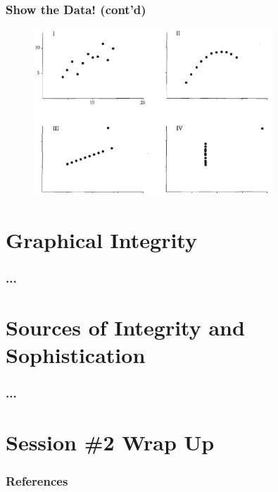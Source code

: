 \documentclass[notes, aspectratio=1610]{beamer}
\begin{document}
\begin{frame}
	\frametitle{Show the Data! (cont'd)}
	\begin{figure}
		\begin{small}
			\begin{center}
				\includegraphics[width=0.80\textwidth]{
					images/anscombe_ii.png
					}
			\end{center}
		\end{small}
	\end{figure}
	
\end{frame}
\section{Graphical Integrity}

\begin{frame}
	\frametitle{...}
\end{frame}

\section{Sources of Integrity and Sophistication}

\begin{frame}
	\frametitle{...}
\end{frame}

\section{Session \#2 Wrap Up}


\begin{frame}
	\frametitle{References}
	\printbibliography
 \end{frame} 
\end{document}
